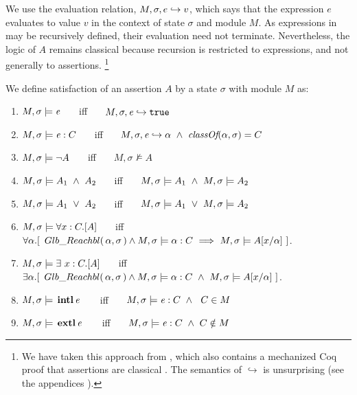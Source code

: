 We   use the evaluation relation, $M, \sigma, e \hookrightarrow v$,
which says that the expression $e$ evaluates
to value $v$ in the context of state $\sigma$ and module $M$.
As expressions in \LangOO may be recursively defined, their evaluation 
need not   %
 terminate. Nevertheless, the logic of $A$ remains classical because recursion is restricted
to expressions, and not generally to assertions.
\footnote{We have taken this approach from , which also contains a mechanized Coq proof that assertions are classical \cite{coqFASE}.
The semantics of $\hookrightarrow$ {is} unsurprising 
(see {the appendices %
\cite{necessityFull}).} } %



\begin{definition} 
\label{def:chainmail-semantics}
We define satisfaction of an assertion $A$ by a %
state $\sigma$ with 
 module $M$ as:
\begin{enumerate}
\item
\label{cExpr}
$M , \sigma \models {\mathit{e}}$ \ \ \ iff \ \ \  $M, \sigma, {\mathit{e}} \hookrightarrow \texttt{true}$
\item
\label{cClass}
$M , \sigma \models {{\mathit{e}}} : C$ \ \ \ iff \ \ \  $M, \sigma, {\mathit{e}} \hookrightarrow \alpha\   \wedge \ \textit{classOf}(\alpha, \sigma)= C$
\item
$M , \sigma \models \neg A$ \ \ \ iff \ \ \  ${M},{\sigma}\nvDash{A}$
\item
$\satisfiesA{M}{\sigma}{A_1\ \wedge\ A_2}$ \ \ \ iff \ \ \  $\satisfiesA{M}{\sigma}{A_1} \   \wedge \ \satisfiesA{M}{\sigma}{A_2}$
\item
$\satisfiesA{M}{\sigma}{A_1\ \vee\ A_2}$ \ \ \ iff \ \ \  $\satisfiesA{M}{\sigma}{A_1}\   \vee \ \satisfiesA{M}{\sigma}{A_2}$

\item
\label{quant1}
$M , \sigma \models \forall x:C.[A]$ \ \ \ iff \ \ \  
 {$\forall \alpha.[\ \GRelevant \alpha \sigma \wedge  \satisfiesA {M}{\sigma} {\alpha:C}  \ \Longrightarrow   \ \satisfiesA{M}{\sigma} {A[x/\alpha]}\ ]$.} 

\item
\label{quant2}
$M , \sigma \models \exists\ x:C.[A]$ \ \ \ iff \ \ \  
 {$\exists \alpha.[\ \GRelevant \alpha \sigma \wedge  \satisfiesA {M}{\sigma} {\alpha:C}  \ \wedge \ \satisfiesA{M}{\sigma} {A[x/\alpha]}\ ]$.} 
\item
\label{cInternal}
$M , \sigma \models {\ensuremath{\, \mathbf{intl}}\, {\mathit{e}}\, }$ \ \ \ iff \ \ \   $M , \sigma \models {{\mathit{e}}} : C \ \wedge\ \ C \in M$
\item
\label{cExternal}
$M , \sigma \models {\ensuremath{\, \mathbf{extl}}\, {\mathit{e}}\, }$ \ \ \ iff \ \ \   $M , \sigma \models {{\mathit{e}}} : C \ \wedge \ C \notin M$
\end{enumerate}
\end{definition}


